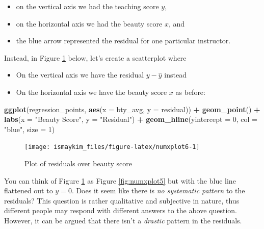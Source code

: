 \documentclass[12pt,]{krantz}
\makeatletter
\newenvironment{Shaded}{\begin{snugshade}}{\end{snugshade}}
\newcommand{\KeywordTok}[1]{\textcolor[rgb]{0.27,0.27,0.27}{\textbf{#1}}}
\newcommand{\DataTypeTok}[1]{\textcolor[rgb]{0.27,0.27,0.27}{#1}}
\newcommand{\DecValTok}[1]{\textcolor[rgb]{0.06,0.06,0.06}{#1}}
\newcommand{\StringTok}[1]{\textcolor[rgb]{0.5,0.5,0.5}{#1}}
\newcommand{\OperatorTok}[1]{\textcolor[rgb]{0.43,0.43,0.43}{\textbf{#1}}}
\newcommand{\NormalTok}[1]{#1}
\providecommand{\tightlist}{%
  \setlength{\itemsep}{0pt}\setlength{\parskip}{0pt}}
\newenvironment{kframe}{%
\medskip{}
\setlength{\fboxsep}{.8em}
 \def\at@end@of@kframe{}%
 \ifinner\ifhmode%
  \def\at@end@of@kframe{\end{minipage}}%
  \begin{minipage}{\columnwidth}%
 \fi\fi%
 \def\FrameCommand##1{\hskip\@totalleftmargin \hskip-\fboxsep
 \colorbox{shadecolor}{##1}\hskip-\fboxsep
     \hskip-\linewidth \hskip-\@totalleftmargin \hskip\columnwidth}%
 \MakeFramed {\advance\hsize-\width
   \@totalleftmargin\z@ \linewidth\hsize
   \@setminipage}}%
 {\par\unskip\endMakeFramed%
 \at@end@of@kframe}
\renewenvironment{Shaded}{\begin{kframe}}{\end{kframe}}
\theoremstyle{definition}
\theoremstyle{definition}
\theoremstyle{definition}
\theoremstyle{remark}
\makeatother
\begin{document}
\begin{itemize}
\tightlist
\item
  on the vertical axis we had the teaching score \(y\),
\item
  on the horizontal axis we had the beauty score \(x\), and
\item
  the blue arrow represented the residual for one particular instructor.
\end{itemize}

Instead, in Figure \ref{fig:numxplot6} below, let's create a scatterplot
where

\begin{itemize}
\tightlist
\item
  On the vertical axis we have the residual \(y-\widehat{y}\) instead
\item
  On the horizontal axis we have the beauty score \(x\) as before:
\end{itemize}

\begin{Shaded}
\begin{Highlighting}[]
\KeywordTok{ggplot}\NormalTok{(regression_points, }\KeywordTok{aes}\NormalTok{(}\DataTypeTok{x =}\NormalTok{ bty_avg, }\DataTypeTok{y =}\NormalTok{ residual)) }\OperatorTok{+}
\StringTok{  }\KeywordTok{geom_point}\NormalTok{() }\OperatorTok{+}
\StringTok{  }\KeywordTok{labs}\NormalTok{(}\DataTypeTok{x =} \StringTok{"Beauty Score"}\NormalTok{, }\DataTypeTok{y =} \StringTok{"Residual"}\NormalTok{) }\OperatorTok{+}
\StringTok{  }\KeywordTok{geom_hline}\NormalTok{(}\DataTypeTok{yintercept =} \DecValTok{0}\NormalTok{, }\DataTypeTok{col =} \StringTok{"blue"}\NormalTok{, }\DataTypeTok{size =} \DecValTok{1}\NormalTok{)}
\end{Highlighting}
\end{Shaded}

\begin{figure}

{\centering \texttt{[image: ismaykim\_files/figure-latex/numxplot6-1]} 

}

\caption{Plot of residuals over beauty score}\label{fig:numxplot6}
\end{figure}

You can think of Figure \ref{fig:numxplot6} as Figure
\ref{fig:numxplot5} but with the blue line flattened out to \(y=0\).
Does it seem like there is \emph{no systematic pattern} to the
residuals? This question is rather qualitative and subjective in nature,
thus different people may respond with different answers to the above
question. However, it can be argued that there isn't a \emph{drastic}
pattern in the residuals.
\end{document}
